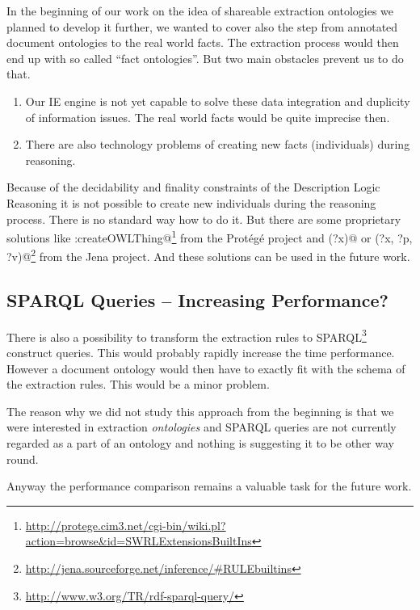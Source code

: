 In the beginning of our work on the idea of shareable extraction ontologies we planned to develop it further, we wanted to cover also the step from annotated document ontologies to the real world facts. The extraction process would then end up with so called ``fact ontologies''. But two main obstacles prevent us to do that.

\begin{enumerate}
	\item Our IE engine is not yet capable to solve these data integration and duplicity of information issues. The real world facts would be quite imprecise then.
	\item There are also technology problems of creating new facts (individuals) during reasoning.
\end{enumerate}

Because of the decidability and finality constraints of the Description Logic Reasoning it is not possible to create new individuals during the reasoning process. There is no standard way how to do it. But there are some proprietary solutions like \verb@swrlx:createOWLThing@\footnote{\url{http://protege.cim3.net/cgi-bin/wiki.pl?action=browse&id=SWRLExtensionsBuiltIns}} from the Prot\'{e}g\'{e} project and \verb@makeTemp(?x)@ or \verb@makeInstance(?x, ?p, ?v)@\footnote{\url{http://jena.sourceforge.net/inference/#RULEbuiltins}} from the Jena project.
And these solutions can be used in the future work. 

\subsection{SPARQL Queries -- Increasing Performance?}

There is also a possibility to transform the extraction rules to SPARQL\footnote{\url{http://www.w3.org/TR/rdf-sparql-query/}} construct queries. This would probably rapidly increase the time performance. However a document ontology would then have to exactly fit with the schema of the extraction rules.  This would be a minor problem. 

The reason why we did not study this approach from the beginning is that we were interested in extraction \emph{ontologies} and SPARQL queries are not currently regarded as a part of an ontology and nothing is suggesting it to be other way round.  

Anyway the performance comparison remains a valuable task for the future work.






